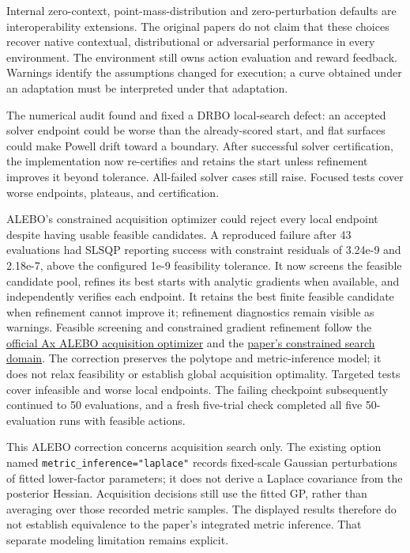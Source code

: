 \documentclass[10pt,a4paper]{article}
\begin{document}
Internal zero-context,\allowbreak{} point-mass-distribution and zero-perturbation defaults are interoperability extensions. The original papers do not claim that these choices recover native contextual,\allowbreak{} distributional or adversarial performance in every environment. The environment still owns action evaluation and reward feedback. Warnings identify the assumptions changed for execution; a curve obtained under an adaptation must be interpreted under that adaptation.


The numerical audit found and fixed a DRBO local-search defect: an accepted solver endpoint could be worse than the already-scored start,\allowbreak{} and flat surfaces could make Powell drift toward a boundary. After successful solver certification,\allowbreak{} the implementation now re-certifies and retains the start unless refinement improves it beyond tolerance. All-failed solver cases still raise. Focused tests cover worse endpoints,\allowbreak{} plateaus,\allowbreak{} and certification.


ALEBO's constrained acquisition optimizer could reject every local endpoint despite having usable feasible candidates. A reproduced failure after 43 evaluations had SLSQP reporting success with constraint residuals of 3.24e-9 and 2.18e-7,\allowbreak{} above the configured 1e-9 feasibility tolerance. It now screens the feasible candidate pool,\allowbreak{} refines its best starts with analytic gradients when available,\allowbreak{} and independently verifies each endpoint. It retains the best finite feasible candidate when refinement cannot improve it; refinement diagnostics remain visible as warnings. Feasible screening and constrained gradient refinement follow the \href{https://github.com/facebook/Ax/blob/0.1.17/ax/models/torch/alebo.py#L470-L526}{official Ax ALEBO acquisition optimizer} and the \href{https://proceedings.neurips.cc/paper_files/paper/2020/file/10fb6cfa4c990d2bad5ddef4f70e8ba2-Paper.pdf}{paper's constrained search domain}. The correction preserves the polytope and metric-inference model; it does not relax feasibility or establish global acquisition optimality. Targeted tests cover infeasible and worse local endpoints. The failing checkpoint subsequently continued to 50 evaluations,\allowbreak{} and a fresh five-trial check completed all five 50-evaluation runs with feasible actions.


This ALEBO correction concerns acquisition search only. The existing option named \texttt{metric\_\allowbreak{}inference=\allowbreak{}"laplace"} records fixed-scale Gaussian perturbations of fitted lower-factor parameters; it does not derive a Laplace covariance from the posterior Hessian. Acquisition decisions still use the fitted GP,\allowbreak{} rather than averaging over those recorded metric samples. The displayed results therefore do not establish equivalence to the paper's integrated metric inference. That separate modeling limitation remains explicit.
\end{document}
